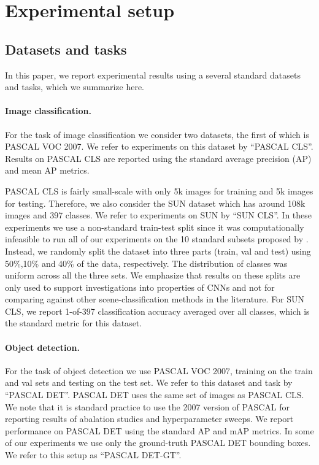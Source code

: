 \section{Experimental setup}
\label{sec:train}

\subsection{Datasets and tasks}
In this paper, we report experimental results using a several standard datasets and tasks, which we summarize here.

\paragraph{Image classification.} For the task of image classification we consider two datasets, the first of which is PASCAL VOC 2007.
We refer to experiments on this dataset by ``PASCAL CLS''.
Results on PASCAL CLS are reported using the standard average precision (AP) and mean AP metrics.

PASCAL CLS is fairly small-scale with only 5k images for training and 5k images for testing.
Therefore, we also consider the SUN dataset \cite{sun} which has around 108k images and 397 classes.
We refer to experiments on SUN by ``SUN CLS''.
In these experiments we use a non-standard train-test split since it was computationally infeasible to run all of our experiments on the 10 standard subsets proposed by \cite{sun}. 
Instead, we randomly split the dataset into three parts (train, val and test) using 50\%,10\% and 40\% of the data, respectively. 
The distribution of classes was uniform across all the three sets.
We emphasize that results on these splits are only used to support investigations into properties of CNNs and not for comparing against other scene-classification methods in the literature.
For SUN CLS, we report 1-of-397 classification accuracy averaged over all classes, which is the standard metric for this dataset.

\paragraph{Object detection.} For the task of object detection we use PASCAL VOC 2007, training on the train and val sets and testing on the test set. 
We refer to this dataset and task by ``PASCAL DET''.
PASCAL DET uses the same set of images as PASCAL CLS.
We note that it is standard practice to use the 2007 version of PASCAL for reporting results of abalation studies and hyperparameter sweeps.
We report performance on PASCAL DET using the standard AP and mAP metrics.
In some of our experiments we use only the ground-truth PASCAL DET bounding boxes.
We refer to this setup as ``PASCAL DET-GT''.

